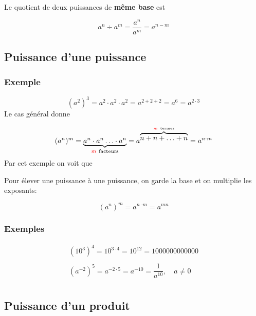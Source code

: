 \documentclass[
  12pt,
]{book}
\begin{document}
\begin{reglebox}
Le quotient de deux puissances de \textbf{même base} est

\[a^n \div a^m = \dfrac{a^n}{a^m} = a^{n-m}\]

\end{reglebox}

\hypertarget{puissance-dune-puissance}{%
\subsection{Puissance d'une puissance}\label{puissance-dune-puissance}}

\hypertarget{exemple-1}{%
\subsubsection{Exemple}\label{exemple-1}}

\[(a^2)^3 = a^2\cdot a^2\cdot a^2 = a^{2+2+2}=a^6=a^{2\cdot 3}\]
Le cas général donne

\[(a^n)^m = \underbrace{a^n\cdot a^n\ldots \cdot a^n}_{{\color{red}m}~\text{facteurs}} = a^{\overbrace{n+n+\ldots+n}^{{\color{red}m}~\text{termes}}}=a^{n\cdot m}\]
Par cet exemple on voit que

\begin{reglebox}
Pour élever une puissance à une puissance, on garde la base et on multiplie les exposants:

\[(a^n)^m = a^{n\cdot m}= a^{mn}\]

\end{reglebox}

\hypertarget{exemples-3}{%
\subsubsection{Exemples}\label{exemples-3}}

\begin{align*}
(10^3)^4 = 10^{3\cdot 4}= 10^{12} = 1000 000 000 000\\
\\
(a^{-2})^5 = a^{-2\cdot 5}= a^{-10} = \dfrac{1}{a^{10}}, \quad a\neq 0\\
\end{align*}

\hypertarget{puissance-dun-produit}{%
\subsection{Puissance d'un produit}\label{puissance-dun-produit}}
\end{document}
